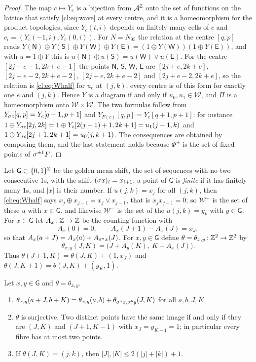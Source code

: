 \begin{proof}
The map $c\mapsto Y_c$ is a bijection from $\mathcal{A}^{\mathbb{Z}}$ onto the set of functions on the lattice that satisfy \eqref{cl:eq:wave} at every centre, and it is a homeomorphism for the product topologies, since $Y_c(t,i)$ depends on finitely many cells of $c$ and $c_i=(Y_c(-1,i),Y_c(0,i))$. For $N=N_{95}$ the relation at the centre $[q,p]$ reads $Y(\mathsf N)\oplus Y(\mathsf S)\oplus Y(\mathsf W)\oplus Y(\mathsf E)=(1\oplus Y(\mathsf W))(1\oplus Y(\mathsf E))$, and with $u=1\oplus Y$ this is $u(\mathsf N)\oplus u(\mathsf S)=u(\mathsf W)\vee u(\mathsf E)$. For the centre $[2j+e-1,2k+e-1]$ the points $\mathsf N$, $\mathsf S$, $\mathsf W$, $\mathsf E$ are $[2j+e,2k+e]$, $[2j+e-2,2k+e-2]$, $[2j+e,2k+e-2]$ and $[2j+e-2,2k+e]$, so the relation is \eqref{cl:eq:Whalf} for $u_e$ at $(j,k)$; every centre is of this form for exactly one $e$ and $(j,k)$. Hence $Y$ is a diagram if and only if $u_0,u_1\in\mathcal W$, and $\Pi$ is a homeomorphism onto $\mathcal W\times\mathcal W$. The two formulas follow from $Y_{\sigma c}[q,p]=Y_c[q-1,p+1]$ and $Y_{F(c)}[q,p]=Y_c[q+1,p+1]$: for instance $1\oplus Y_{\sigma c}[2j,2k]=1\oplus Y_c[2(j-1)+1,2k+1]=u_1(j-1,k)$ and $1\oplus Y_{\sigma c}[2j+1,2k+1]=u_0(j,k+1)$. The consequences are obtained by composing them, and the last statement holds because $\Phi^\pm$ is the set of fixed points of $\sigma^{\pm1}F$.
\end{proof}

Let $\mathsf G\subset\{0,1\}^{\mathbb{Z}}$ be the golden mean shift, the set of sequences with no two consecutive $1$s, with the shift $(\sigma x)_i=x_{i+1}$; a point of $\mathsf G$ is \emph{finite} if it has finitely many $1$s, and $|x|$ is their number. If $u(j,k)=x_j$ for all $(j,k)$, then \eqref{cl:eq:Whalf} says $x_j\oplus x_{j-1}=x_j\vee x_{j-1}$, that is $x_jx_{j-1}=0$; so $\mathcal W^+$ is the set of these $u$ with $x\in \mathsf G$, and likewise $\mathcal W^-$ is the set of the $u(j,k)=y_k$ with $y\in \mathsf G$. For $x\in \mathsf G$ let $A_x\colon\mathbb{Z}\to\mathbb{Z}$ be the counting function with
\[
A_x(0)=0,\qquad A_x(J+1)-A_x(J)=x_J ,
\]
so that $A_x(a+J)=A_x(a)+A_{\sigma^ax}(J)$. For $x,y\in \mathsf G$ define $\theta=\theta_{x,y}\colon\mathbb{Z}^2\to\mathbb{Z}^2$ by
\[
\theta_{x,y}(J,K)=\bigl(J+A_y(K),\ K+A_x(J)\bigr).
\]
Thus $\theta(J+1,K)=\theta(J,K)+(1,x_J)$ and $\theta(J,K+1)=\theta(J,K)+(y_K,1)$.

\begin{lemma}\label{cl:lem:95theta}
Let $x,y\in \mathsf G$ and $\theta=\theta_{x,y}$.
\begin{enumerate}
\item[(i)] $\theta_{x,y}(a+J,b+K)=\theta_{x,y}(a,b)+\theta_{\sigma^ax,\sigma^by}(J,K)$ for all $a,b,J,K$.
\item[(ii)] $\theta$ is surjective. Two distinct points have the same image if and only if they are $(J,K)$ and $(J+1,K-1)$ with $x_J=y_{K-1}=1$; in particular every fibre has at most two points.
\item[(iii)] If $\theta(J,K)=(j,k)$, then $|J|,|K|\le2(|j|+|k|)+1$.
\end{enumerate}
\end{lemma}

